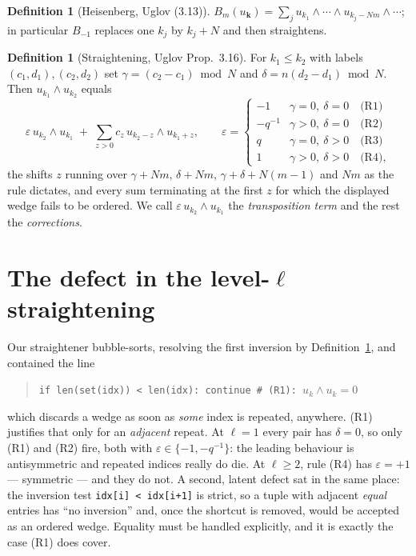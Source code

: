 \documentclass[11pt]{article}
\theoremstyle{definition}
\newtheorem{definition}[theorem]{Definition}
\theoremstyle{remark}
\newcommand{\bk}{\mathbf{k}}
\begin{document}
\begin{definition}[Heisenberg, Uglov (3.13)]\label{def:B}
$B_m(u_{\bk})=\sum_{j} u_{k_1}\wedge\cdots\wedge u_{k_j-Nm}\wedge\cdots$; in particular
$B_{-1}$ replaces one $k_j$ by $k_j+N$ and then straightens.
\end{definition}

\begin{definition}[Straightening, Uglov Prop.\ 3.16]\label{def:R}
For $k_1\le k_2$ with labels $(c_1,d_1),(c_2,d_2)$ set $\gamma=(c_2-c_1)\bmod N$ and
$\delta=n(d_2-d_1)\bmod N$. Then $u_{k_1}\wedge u_{k_2}$ equals
\[
\varepsilon\,u_{k_2}\wedge u_{k_1}\;+\;\sum_{z>0} c_z\,u_{k_2-z}\wedge u_{k_1+z},
\qquad
\varepsilon=\begin{cases}
-1 & \gamma=0,\ \delta=0 \quad\text{(R1)}\\
-q^{-1} & \gamma>0,\ \delta=0 \quad\text{(R2)}\\
q & \gamma=0,\ \delta>0 \quad\text{(R3)}\\
1 & \gamma>0,\ \delta>0 \quad\text{(R4)},
\end{cases}
\]
the shifts $z$ running over $\gamma+Nm$, $\delta+Nm$, $\gamma+\delta+N(m-1)$ and $Nm$ as
the rule dictates, and every sum terminating at the first $z$ for which the displayed
wedge fails to be ordered. We call $\varepsilon\,u_{k_2}\wedge u_{k_1}$ the
\emph{transposition term} and the rest the \emph{corrections}.
\end{definition}

\section{The defect in the level-$\ell$ straightening}\label{sec:bug}

Our straightener bubble-sorts, resolving the first inversion by
Definition~\ref{def:R}, and contained the line
\begin{quote}
\texttt{if len(set(idx)) < len(idx): continue \quad\# (R1): $u_k\wedge u_k=0$}
\end{quote}
which discards a wedge as soon as \emph{some} index is repeated, anywhere. (R1) justifies
that only for an \emph{adjacent} repeat. At $\ell=1$ every pair has $\delta=0$, so only
(R1) and (R2) fire, both with $\varepsilon\in\{-1,-q^{-1}\}$: the leading behaviour is
antisymmetric and repeated indices really do die. At $\ell\ge2$, rule (R4) has
$\varepsilon=+1$ --- symmetric --- and they do not. A second, latent defect sat in the same
place: the inversion test \texttt{idx[i] < idx[i+1]} is strict, so a tuple with adjacent
\emph{equal} entries has ``no inversion'' and, once the shortcut is removed, would be
accepted as an ordered wedge. Equality must be handled explicitly, and it is exactly the
case (R1) does cover.
\end{document}
